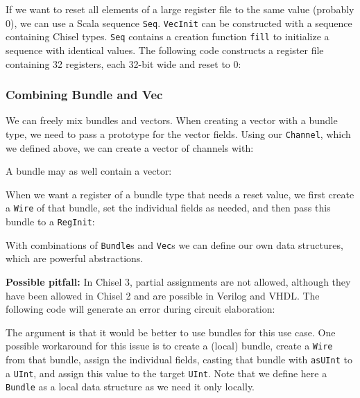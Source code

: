 \documentclass[%
    10pt,
    headinclude, footexclude,
    openright, %
    notitlepage,
    cleardoubleempty,
    headsepline,
    pointlessnumbers,
    bibtotoc, idxtotoc,
    ]{scrbook}
\newcommand{\code}[1]{{\lstinline[basicstyle=\small\ttfamily]{#1}}}
\begin{document}

If we want to reset all elements of a large register file to the same value (probably 0), we
can use a Scala sequence \code{Seq}. \code{VecInit} can be constructed with a sequence
containing Chisel types. \code{Seq} contains a creation function \code{fill} to initialize a sequence
with identical values.
The following code constructs a register file containing 32 registers, each 32-bit wide and reset to
0:


\subsubsection{Combining Bundle and Vec}

We can freely mix bundles and vectors. When creating a vector with a bundle
type, we need to pass a prototype for the vector fields. Using our
\code{Channel}, which we defined above, we can create a vector of channels with:


\noindent A bundle may as well contain a vector:


When we want a register of a bundle type that needs a reset value,
we first create a \code{Wire} of that bundle, set the individual fields
as needed, and then pass this bundle to a \code{RegInit}:


With combinations of \code{Bundle}s and \code{Vec}s we can define our own data
structures, which are powerful abstractions.

{\bf Possible pitfall:} In Chisel 3, partial assignments are not allowed, although they have been
allowed in Chisel 2 and are possible in Verilog and VHDL. The following code will generate
an error during circuit elaboration:


\noindent The argument is that it would be better to use bundles for this use case.
One possible workaround for this issue is to create a (local) bundle, create a \code{Wire}
from that bundle, assign the individual fields, casting that bundle with \code{asUInt}
to a \code{UInt}, and assign this value to the target \code{UInt}.
Note that we define here a \code{Bundle} as a local data structure as we need it only
locally.
\end{document}

